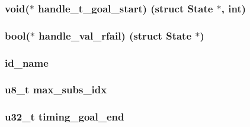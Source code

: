 \subsubsection[{\texorpdfstring{handle\+\_\+t\+\_\+goal\+\_\+start}{handle_t_goal_start}}]{\setlength{\rightskip}{0pt plus 5cm}void($\ast$ handle\+\_\+t\+\_\+goal\+\_\+start) (struct {\bf State} $\ast$, int)}\hypertarget{struct_state_a85025dd68c4035546894c6b14542e528}{}\label{struct_state_a85025dd68c4035546894c6b14542e528}
\subsubsection[{\texorpdfstring{handle\+\_\+val\+\_\+rfail}{handle_val_rfail}}]{\setlength{\rightskip}{0pt plus 5cm}bool($\ast$ handle\+\_\+val\+\_\+rfail) (struct {\bf State} $\ast$)}\hypertarget{struct_state_a840b9de3ab0a84eed21af071a716348b}{}\label{struct_state_a840b9de3ab0a84eed21af071a716348b}
\subsubsection[{\texorpdfstring{id\+\_\+name}{id_name}}]{ id\+\_\+name}\hypertarget{struct_state_abb59b67712b25f52806b3a75d5ced8e1}{}\label{struct_state_abb59b67712b25f52806b3a75d5ced8e1}
\subsubsection[{\texorpdfstring{max\+\_\+subs\+\_\+idx}{max_subs_idx}}]{\setlength{\rightskip}{0pt plus 5cm}u8\+\_\+t max\+\_\+subs\+\_\+idx}\hypertarget{struct_state_a73f7b81a54eb23206152bb815a0de136}{}\label{struct_state_a73f7b81a54eb23206152bb815a0de136}
\subsubsection[{\texorpdfstring{timing\+\_\+goal\+\_\+end}{timing_goal_end}}]{\setlength{\rightskip}{0pt plus 5cm}u32\+\_\+t timing\+\_\+goal\+\_\+end}\hypertarget{struct_state_af1c6f6dee4c21d85ddf7da3864d1cbee}{}\label{struct_state_af1c6f6dee4c21d85ddf7da3864d1cbee}
